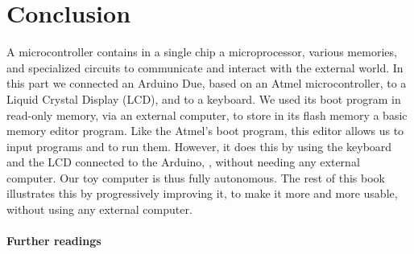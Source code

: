
\chapter*{Conclusion}

A microcontroller contains in a single chip a microprocessor, various memories,
and specialized circuits to communicate and interact with the external world.
In this part we connected an Arduino Due, based on an Atmel microcontroller, to
a Liquid Crystal Display (LCD), and to a keyboard. We used its boot program in
read-only memory, via an external computer, to store in its flash memory a
basic memory editor program. Like the Atmel's boot program, this editor allows
us to input programs and to run them. However, it does this by using the
keyboard and the LCD connected to the Arduino, \ie, without needing any
external computer. Our toy computer is thus fully autonomous. The rest of this
book illustrates this by progressively improving it, to make it more and more
usable, without using any external computer.

\subsubsection{Further readings}

